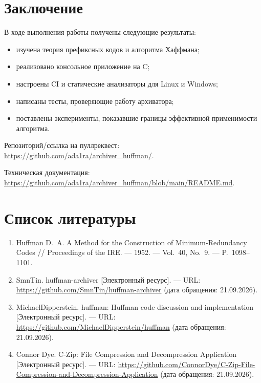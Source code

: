 \documentclass[a4paper]{article}
\begin{document}
\section{Заключение}

В ходе выполнения работы получены следующие результаты:

\begin{itemize}
    \item изучена теория префиксных кодов и алгоритма Хаффмана;
    \item реализовано консольное приложение на C;
    \item настроены CI и статические анализаторы для Linux и Windows;
    \item написаны тесты, проверяющие работу архиватора;
    \item поставлены эксперименты, показавшие границы эффективной применимости алгоритма.
\end{itemize}

Репозиторий/ссылка на пуллреквест: \url{https://github.com/ada1ra/archiver_huffman/}.

Техническая документация: \url{https://github.com/ada1ra/archiver_huffman/blob/main/README.md}.

\section*{Список литературы}

\begin{enumerate}
    \item Huffman D.~A. A Method for the Construction of Minimum-Redundancy
    Codes // Proceedings of the IRE. — 1952. — Vol.~40, No.~9. — P.~1098--1101.

    \item SmnTin. huffman-archiver [Электронный ресурс]. — URL:
    \url{https://github.com/SmnTin/huffman-archiver}
    (дата обращения: 21.09.2026).

    \item MichaelDipperstein. huffman: Huffman code discussion and
    implementation [Электронный ресурс]. — URL:
    \url{https://github.com/MichaelDipperstein/huffman}
    (дата обращения: 21.09.2026).

    \item Connor Dye. C-Zip: File Compression and Decompression
    Application [Электронный ресурс]. — URL:
    \url{https://github.com/ConnorDye/C-Zip-File-Compression-and-Decompression-Application}
    (дата обращения: 21.09.2026).
\end{enumerate}
\end{document}
